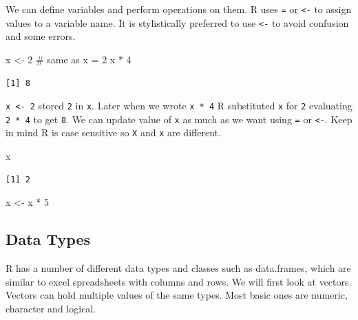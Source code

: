 \documentclass[
  letterpaper,
]{book}
\newenvironment{Shaded}{\begin{snugshade}}{\end{snugshade}}
\newcommand{\CommentTok}[1]{\textcolor[rgb]{0.37,0.37,0.37}{#1}}
\newcommand{\DecValTok}[1]{\textcolor[rgb]{0.68,0.00,0.00}{#1}}
\newcommand{\NormalTok}[1]{\textcolor[rgb]{0.00,0.23,0.31}{#1}}
\newcommand{\OtherTok}[1]{\textcolor[rgb]{0.00,0.23,0.31}{#1}}
\newcommand{\SpecialCharTok}[1]{\textcolor[rgb]{0.37,0.37,0.37}{#1}}
\begin{document}
We can define variables and perform operations on them. R uses
\texttt{=} or \texttt{\textless{}-} to assign values to a variable name.
It is stylistically preferred to use \texttt{\textless{}-} to avoid
confusion and some errors.

\begin{Shaded}
\begin{Highlighting}[]
\NormalTok{x }\OtherTok{\textless{}{-}} \DecValTok{2} \CommentTok{\# same as x = 2}
\NormalTok{x }\SpecialCharTok{*} \DecValTok{4}
\end{Highlighting}
\end{Shaded}

\begin{verbatim}
[1] 8
\end{verbatim}

\texttt{x\ \textless{}-\ 2} stored \texttt{2} in \texttt{x}. Later when
we wrote \texttt{x\ *\ 4} R substituted \texttt{x} for \texttt{2}
evaluating \texttt{2\ *\ 4} to get \texttt{8}. We can update value of
\texttt{x} as much as we want using \texttt{=} or \texttt{\textless{}-}.
Keep in mind R is case sensitive so \texttt{X} and \texttt{x} are
different.

\begin{Shaded}
\begin{Highlighting}[]
\NormalTok{x}
\end{Highlighting}
\end{Shaded}

\begin{verbatim}
[1] 2
\end{verbatim}

\begin{Shaded}
\begin{Highlighting}[]
\NormalTok{x }\OtherTok{\textless{}{-}}\NormalTok{ x }\SpecialCharTok{*} \DecValTok{5}
\end{Highlighting}
\end{Shaded}

\hypertarget{data-types}{%
\subsection{Data Types}\label{data-types}}

R has a number of different data types and classes such as data.frames,
which are similar to excel spreadsheets with columns and rows. We will
first look at vectors. Vectors can hold multiple values of the same
types. Most basic ones are numeric, character and logical.
\end{document}
